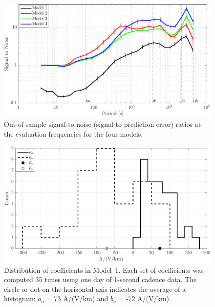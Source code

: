 \documentclass[draft,linenumbers]{agujournal2018}
\begin{document}
\begin{figure}[h]
  \centering
  \includegraphics[width=\textwidth]{figures/plot_model_summary_SN-options-1.pdf}
  \caption{Out-of-sample signal-to-noise (signal to prediction error) ratios at the evaluation frequencies for the four models.}
  \label{SN}
\end{figure}

\begin{figure}[h]
  \centering
  \includegraphics[width=\textwidth]{figures/plot_model_summary_aobo_histograms-options-1.pdf}
  \caption{Distribution of coefficients in Model~1. Each set of coefficients was computed 35 times using one day of 1-second cadence data. The circle or dot on the horizontal axis indicates the average of a histogram: $a_o$ = 73 A/(V/km) and $b_o$ = -72 A/(V/km).}
  \label{histogram}
\end{figure}
\end{document}
